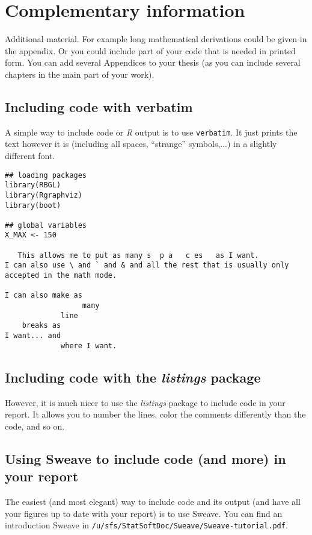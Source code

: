 \chapter{Complementary information}
\label{app:complement}

Additional material. For example long mathematical derivations could be
given in the appendix. Or you could include part of your code that is
needed in printed form. You can add several Appendices to your thesis (as
you can include several chapters in the main part of your work).

\section{Including \Rp code with verbatim}
A simple way to include code or {\it R} output is to use
\texttt{verbatim}. It just prints the text however it is (including all
spaces, ``strange'' symbols,...) in a slightly different font.
\begin{verbatim}
## loading packages
library(RBGL)
library(Rgraphviz)
library(boot)

## global variables
X_MAX <- 150

   This allows me to put as many s  p a   c es   as I want.
I can also use \ and ` and & and all the rest that is usually only 
accepted in the math mode.

I can also make as 
                  many 
             line 
    breaks as 
I want... and
             where I want. 
\end{verbatim}

\section{Including \Rp code with the \emph{listings} package}
However, it is much nicer to use the \emph{listings} package to include \Rp
code in your report. It allows you to number the lines, color the comments
differently than the code, and so on.




\section{Using Sweave to include \Rp code (and more) in your report}
The easiest (and most elegant) way to include \Rp code and its output (and
have all your figures up to date with your report) is to use Sweave. You
can find an introduction Sweave in \texttt{/u/sfs/StatSoftDoc/Sweave/Sweave-tutorial.pdf}.

